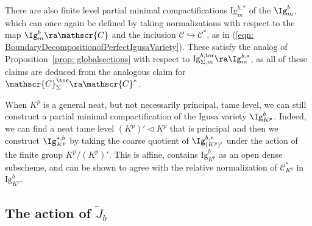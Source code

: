 \documentclass[letterpaper,11pt]{amsart}
\begin{document}
\begin{remark}{\label{rem: WhatarethepartialminimalCompactifications}}
There are also finite level partial minimal compactifications $\mathrm{Ig}^{b,*}_{m}$ of the $\Ig^{b}_{m}$, which can once again be defined by taking normalizations with respect to the map $\Ig^{b}_{m} \ra \mathscr{C}$ and the inclusion $\mathscr{C} \hookrightarrow \mathscr{C}^{*}$, as in (\ref{eqn: BoundaryDecompositionofPerfectIgusaVariety}). These satisfy the analog of Proposition~\ref{prop: globalsections} with respect to $\mathrm{Ig}^{b,\mathrm{tor}}_{\Sigma,m} \ra \Ig^{b,*}_{m}$, as all of these claims are deduced from the analogous claim for $\mathscr{C}_{\Sigma}^{\tor} \ra \mathscr{C}^{*}$.
\end{remark}
\begin{remark}
    When $K^p$ is a general neat, but not necessarily principal, tame level, we can still construct a partial minimal compactification of the Igusa variety $\Ig_{K^p}^b$. Indeed, we can find a neat tame level $(K^p)'\triangleleft K^p$ that is principal and then we construct $\Ig^{*,b}_{K^p}$ by taking the coarse quotient of $\Ig^{b,*}_{(K^p)'}$ under the action of the finite group $K^p/(K^p)'$. This is affine, contains  $\mathrm{Ig}^b_{K^p}$ as an open dense subscheme, and can be shown to agree with the relative normalization of $\mathscr{C}^*_{K^p}$ in $\mathrm{Ig}^b_{K^p}$.   %
\end{remark}  

\subsection{The action of $\widetilde{J}_b$}\label{Sec:Action}
\end{document}
